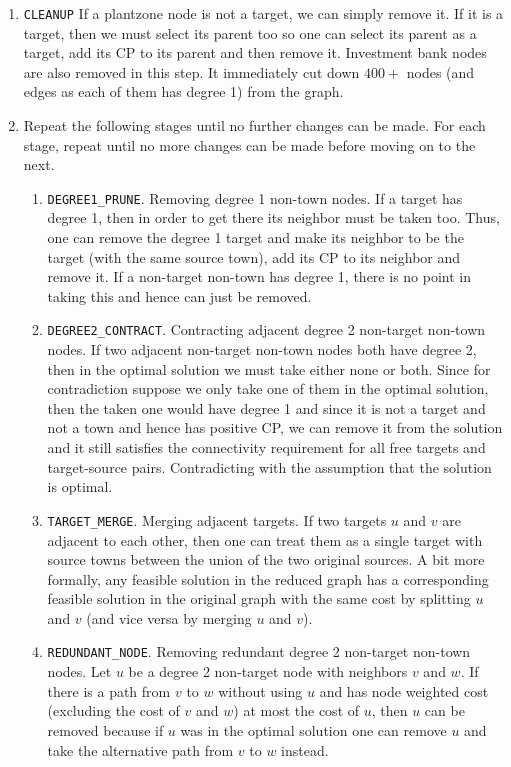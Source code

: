 \documentclass[11pt]{article}
\theoremstyle{definition}
\theoremstyle{remark}
\begin{document}
\begin{enumerate}
    \item[$\bullet$] \texttt{CLEANUP} If a plantzone node is not a target, we can simply remove it. If it is a target, then we must select its parent too so one can select its parent as a target, add its CP to its parent and then remove it. Investment bank nodes are also removed in this step. It immediately cut down $400+$ nodes (and edges as each of them has degree 1) from the graph.

    \item[$\bullet$] Repeat the following stages until no further changes can be made. For each stage, repeat until no more changes can be made before moving on to the next.

    \begin{enumerate}
        \item[1.] \texttt{DEGREE1\_PRUNE}. Removing degree 1 non-town nodes. If a target has degree 1, then in order to get there its neighbor must be taken too. Thus, one can remove the degree 1 target and make its neighbor to be the target (with the same source town), add its CP to its neighbor and remove it. If a non-target non-town has degree 1, there is no point in taking this and hence can just be removed.

        \item[2.] \texttt{DEGREE2\_CONTRACT}. Contracting adjacent degree 2 non-target non-town nodes. If two adjacent non-target non-town nodes both have degree 2, then in the optimal solution we must take either none or both. Since for contradiction suppose we only take one of them in the optimal solution, then the taken one would have degree 1 and since it is not a target and not a town and hence has positive CP, we can remove it from the solution and it still satisfies the connectivity requirement for all free targets and target-source pairs. Contradicting with the assumption that the solution is optimal.

        \item[3.] \texttt{TARGET\_MERGE}. Merging adjacent targets. If two targets $u$ and $v$ are adjacent to each other, then one can treat them as a single target with source towns between the union of the two original sources. A bit more formally, any feasible solution in the reduced graph has a corresponding feasible solution in the original graph with the same cost by splitting $u$ and $v$ (and vice versa by merging $u$ and $v$).

        \item[4.] \texttt{REDUNDANT\_NODE}. Removing redundant degree 2 non-target non-town nodes. Let $u$ be a degree 2 non-target node with neighbors $v$ and $w$. If there is a path from $v$ to $w$ without using $u$ and has node weighted cost (excluding the cost of $v$ and $w$) at most the cost of $u$, then $u$ can be removed because if $u$ was in the optimal solution one can remove $u$ and take the alternative path from $v$ to $w$ instead.


\end{enumerate}
\end{enumerate}
\end{document}
